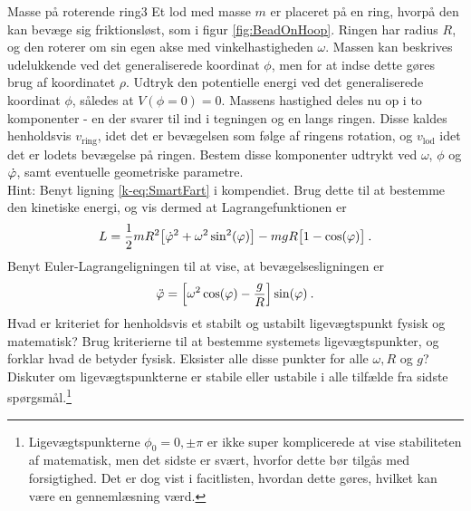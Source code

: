 \begin{opgave}{Masse på roterende ring}{3}
Et lod med masse $m$ er placeret på en ring, hvorpå den kan bevæge sig friktionsløst, som i figur \ref{fig:BeadOnHoop}. Ringen har radius $R$, og den roterer om sin egen akse med vinkelhastigheden $\omega$. Massen kan beskrives udelukkende ved det generaliserede koordinat $\phi$, men for at indse dette gøres brug af koordinatet $\rho$.
\opg Udtryk den potentielle energi ved det generaliserede koordinat $\phi$, således at $V(\phi=0)=0$.
\opg Massens hastighed deles nu op i to komponenter - en der svarer til ind i tegningen og en langs ringen. Disse kaldes henholdsvis $v_\mathrm{ring}$, idet det er bevægelsen som følge af ringens rotation, og $v_\mathrm{lod}$ idet det er lodets bevægelse på ringen. Bestem disse komponenter udtrykt ved $\omega$, $\phi$ og $\dot{\varphi}$, samt eventuelle geometriske parametre.\\
Hint: Benyt ligning \eqref{k-eq:SmartFart} i kompendiet.
\opg Brug dette til at bestemme den kinetiske energi, og vis dermed at Lagrangefunktionen er
\begin{align*}
	L = \frac{1}{2}mR^2\big[\dot{\varphi}^2 + \omega^2\sin^2(\varphi)\big] - mgR\big[1-\cos(\varphi)\big] \: .
\end{align*}
\opg Benyt Euler-Lagrangeligningen til at vise, at bevægelsesligningen er
\begin{align*}
	\ddot{\varphi} = \left[\omega^2\cos(\varphi) - \frac{g}{R}\right]\sin(\varphi) \: .
\end{align*}
\opg Hvad er kriteriet for henholdsvis et stabilt og ustabilt ligevægtspunkt fysisk og matematisk?
\opg Brug kriterierne til at bestemme systemets ligevægtspunkter, og forklar hvad de betyder fysisk.
\opg Eksister alle disse punkter for alle $\omega, R$ og $g$?
\opg Diskuter om ligevægtspunkterne er stabile eller ustabile i alle tilfælde fra sidste spørgsmål.\footnote{Ligevægtspunkterne $\phi_0 = 0,\pm\pi$ er ikke super komplicerede at vise stabiliteten af matematisk, men det sidste er svært, hvorfor dette bør tilgås med forsigtighed. Det er dog vist i facitlisten, hvordan dette gøres, hvilket kan være en gennemlæsning værd.}
\end{opgave}
%
%
